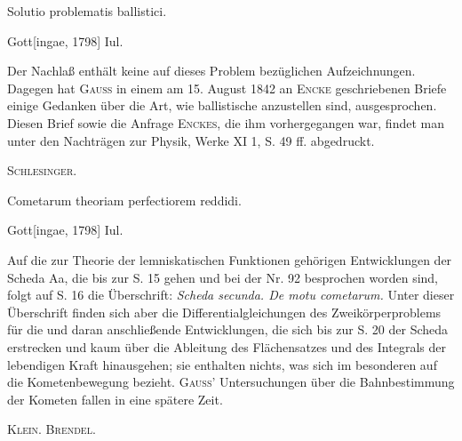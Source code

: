 \indent Solutio problematis ballistici.
\par\noindent\hfill Gott[ingae, 1798] Iul.

\medskip\begingroup\small
\indent Der Nachlaß enthält keine auf dieses Problem bezüglichen Aufzeichnungen. Dagegen hat \textsc{Gauss} in einem am 15. August 1842 an \textsc{Encke} geschriebenen Briefe einige Gedanken über die Art, wie ballistische  anzustellen sind, ausgesprochen. Diesen Brief sowie die Anfrage \textsc{Enckes}, die ihm vorhergegangen war, findet man unter den Nachträgen zur Physik, Werke XI 1, S. 49 ff. abgedruckt.
\par\noindent\hfill\textsc{Schlesinger.}
\par\endgroup

\indent Cometarum theoriam perfectiorem reddidi.
\par\noindent\hfill Gott[ingae, 1798] Iul.

\medskip\begingroup\small
\indent Auf die zur Theorie der lemniskatischen Funktionen gehörigen Entwicklungen der Scheda Aa, die bis zur S. 15 gehen und bei der Nr. 92 besprochen worden sind, folgt auf S. 16 die Überschrift: \textit{Scheda secunda. De motu cometarum.} Unter dieser Überschrift finden sich aber die Differentialgleichungen des Zweikörperproblems für die  und daran anschließende Entwicklungen, die sich bis zur S. 20 der Scheda erstrecken und kaum über die Ableitung des Flächensatzes und des Integrals der lebendigen Kraft hinausgehen; sie enthalten nichts, was sich im besonderen auf die Kometenbewegung bezieht. \textsc{Gauss}’ Untersuchungen über die Bahnbestimmung der Kometen fallen in eine spätere Zeit.
\par\noindent\hfill\textsc{Klein. Brendel.}
\par\endgroup
